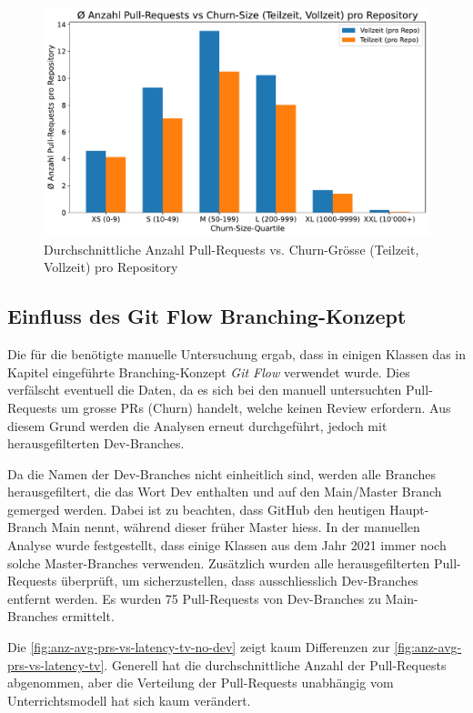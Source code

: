 \begin{figure}[htbp]
    \includegraphics[width=\textwidth]{Figures/avg-anz-prs-vs-churn-size-tz-vz-pro-repo.pdf}
    \caption{Durchschnittliche Anzahl Pull-Requests vs. Churn-Grösse (Teilzeit, Vollzeit) pro Repository}
    \label{fig:avg-anz-prs-vs-churn-size-tz-vz-pro-repo}
\end{figure}


\subsection{Einfluss des Git Flow Branching-Konzept}
Die für die  benötigte manuelle Untersuchung ergab, dass in einigen Klassen das in Kapitel  eingeführte Branching-Konzept \textit{Git Flow} verwendet wurde. Dies verfälscht eventuell die Daten, da es sich bei den manuell untersuchten Pull-Requests um grosse PRs (Churn) handelt, welche keinen Review erfordern. Aus diesem Grund werden die Analysen erneut durchgeführt, jedoch mit herausgefilterten Dev-Branches.

Da die Namen der Dev-Branches nicht einheitlich sind, werden alle Branches herausgefiltert, die das Wort Dev enthalten und auf den Main/Master Branch gemerged werden. Dabei ist zu beachten, dass GitHub den heutigen Haupt-Branch Main nennt, während dieser früher Master hiess. In der manuellen Analyse wurde festgestellt, dass einige Klassen aus dem Jahr 2021 immer noch solche Master-Branches verwenden. Zusätzlich wurden alle herausgefilterten Pull-Requests überprüft, um sicherzustellen, dass ausschliesslich Dev-Branches entfernt werden. Es wurden 75 Pull-Requests von Dev-Branches zu Main-Branches ermittelt.

\newpage
Die \autoref{fig:anz-avg-prs-vs-latency-tv-no-dev} zeigt kaum Differenzen zur \autoref{fig:anz-avg-prs-vs-latency-tv}. Generell hat die durchschnittliche Anzahl der Pull-Requests abgenommen, aber die Verteilung der Pull-Requests unabhängig vom Unterrichtsmodell hat sich kaum verändert. 

